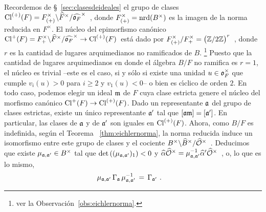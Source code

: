 Recordemos de \S~\ref{sec:clasesdeideales} el grupo de clases
\begin{math}
	\Class[(+)]{F}=
		F_{(+)}^{\times}\backslash\Idfin{F}/\Idfin{\oka{F}}
\end{math}~, donde $F_{(+)}^{\times}=\nrd(B^{\times})$ es la imagen de la norma
reducida en $F^{\times}$. El n\'{u}cleo del epimorfismo can\'{o}nico
\begin{math}
	\pClass{F}=
		F_{+}^{\times}\backslash\Idfin{F}/\Idfin{\oka{F}}
			\rightarrow\Class[(+)]{F}
\end{math}~est\'{a} dado por
\begin{math}
	F_{(+)}^{\times}/F_{+}^{\times}=\big(\bb{Z}/2\bb{Z}\big)^{r}
\end{math}~, donde $r$ es la cantidad de lugares arquimedianos no ramificados
de $B$.%
\footnote{
	ver la Observaci\'{o}n~\ref{obs:eichlernorma}.
}
Puesto que la cantidad de lugares arquimedianos en donde el \'{a}lgebra
$B/F$ no ramifica es $r=1$, el n\'{u}cleo es trivial --este es el caso, si y
s\'{o}lo si existe una unidad $u\in\oka{F}^{\times}$ que cumple $v_{i}(u)>0$
para $i\geq 2$ y $v_{1}(u)<0$-- o bien es c\'{\i}clico de orden $2$. En todo
caso, podemos elegir un ideal $\frak{m}$ de $F$ cuya clase estricta genere el
n\'{u}cleo del morfismo can\'{o}nico $\pClass{F}\rightarrow\Class[(+)]{F}$.
Dado un representante $\frak{a}$ del grupo de clases estrictas, existe un
\'{u}nico representante $\frak{a}'$ tal que $[\frak{a}\frak{m}]=[\frak{a}']$.
En particular, las clases de $\frak{a}$ y de $\frak{a}'$ son iguales en
$\Class[(+)]{F}$. Ahora, como $B/F$ es indefinida, seg\'{u}n el Teorema~%
\ref{thm:eichlernorma}, la norma reducida induce un isomorfismo entre este
grupo de clases y el cociente
\begin{math}
	B^{\times}\backslash\Idfin{B}/\Idfin{\cal{O}}
\end{math}~. Deducimos que existe $\mu_{\frak{a},\frak{a}'}\in B^{\times}$ tal
que $\det((\mu_{\frak{a},\frak{a}'})_{1})<0$ y
\begin{math}
	\hhat{\alpha}\Idfin{\cal{O}}=\mu_{\frak{a},\frak{a}'}^{-1}
		\hhat{\alpha}'\Idfin{\cal{O}}
\end{math}~,
o, lo que es lo mismo,
\begin{align*}
	\mu_{\frak{a},\frak{a}'}\,\Gamma_{\frak{a}}\,
		\mu_{\frak{a},\frak{a}'}^{-1} & \,=\,\Gamma_{\frak{a}'}
	\text{ .}
\end{align*}
